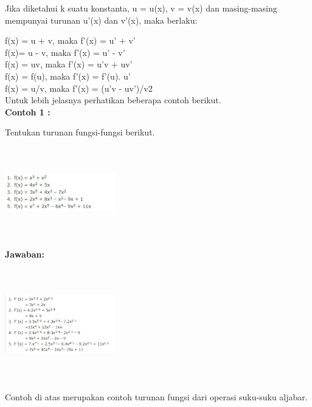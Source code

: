 \documentclass[11pt,fleqn]{book} %
\begin{document}
\noindent
Jika diketahui k suatu konstanta, u = u(x),  v = v(x) dan masing-masing mempunyai turunan u'(x) dan v'(x), maka berlaku:
 

\noindent
f(x) = u + v,   maka f'(x) = u' + v'\\ 

\noindent 
f(x)= u - v,  maka f'(x) = u' - v'\\

\noindent 
f(x) = uv, maka f'(x) = u'v + uv'\\

\noindent 
f(x) = f(u), maka f'(x) = f'(u). u'\\

\noindent 
f(x) = u/v, maka f'(x) = (u'v - uv')/v2\\

\noindent 
Untuk lebih jelasnya perhatikan beberapa contoh berikut.\\

\noindent
\textbf{Contoh 1 :}

\noindent
Tentukan turunan fungsi-fungsi berikut.
\noindent

\noindent 
\begin{center}
\includegraphics*[width=1.90in, height=1.55in]{Pictures/TurunanFungsi13.JPG}
\end{center}

\noindent
\textbf{Jawaban:}

\noindent 
\begin{center}
\includegraphics*[width=1.90in, height=1.90in]{Pictures/TurunanFungsi14.JPG}
\end{center}

\noindent 
Contoh di atas merupakan contoh turunan fungsi dari operasi suku-suku aljabar.
\end{document}
